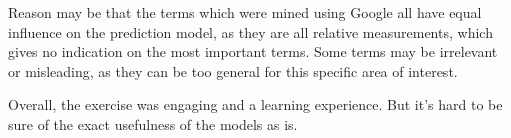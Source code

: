 \documentclass{sig-alternate}
\begin{document}
Reason may be that the terms which were mined using Google all have equal influence on the prediction model, as they are all relative measurements, which gives no indication on the most important terms. Some terms may be irrelevant or misleading, as they can be too general for this specific area of interest.

Overall, the exercise was engaging and a learning experience. But it's hard to be sure of the exact usefulness of the models as is.


%
%
\end{document}
